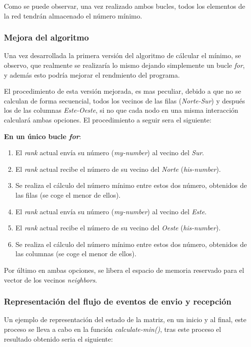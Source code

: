 \documentclass[11pt]{article}
\begin{document}



Como se puede observar, una vez realizado ambos bucles, todos los elementos de la red tendrán almacenado el número mínimo.


\subsubsection{Mejora del algoritmo}
Una vez desarrollada la primera versión del algoritmo de cálcular el mínimo, se observo, que realmente se realizaría lo mismo dejando simplemente un bucle \textit{for}, y además esto podría mejorar el rendmiento del programa.

El procedimiento de esta versión mejorada, es mas peculiar, debido a que no se calculan de forma secuencial, todos los vecinos de las filas (\textit{Norte-Sur}) y después los de las columnas \textit{Este-Oeste}, si no que cada nodo en una misma interacción calculará ambas opciones. El procedimiento a seguir sera el siguiente:

\textbf{En un único bucle \textit{for}}:
\begin{enumerate}
	\item El \textit{rank} actual envía su número (\textit{my-number}) al vecino del \textit{Sur}.
	\item El \textit{rank} actual recibe el número de su vecino del \textit{Norte} (\textit{his-number}).
	\item Se realiza el cálculo del número mínimo entre estos dos número, obtenidos de las filas (se coge el menor de ellos).
	\item El \textit{rank} actual envía su número (\textit{my-number}) al vecino del \textit{Este}.
	\item El \textit{rank} actual recibe el número de su vecino del \textit{Oeste} (\textit{his-number}).
	\item Se realiza el cálculo del número mínimo entre estos dos número, obtenidos de las columnas (se coge el menor de ellos).
\end{enumerate}



Por último en ambas opciones, se libera el espacio de memoria reservado para el vector de los vecinos \textit{neighbors}.
\\

\subsubsection{Representación del flujo de eventos de envio y recepción}
Un ejemplo de representación del estado de la matriz, en un inicio y al final, este proceso se lleva a cabo en la función \textit{calculate-min()}, tras este proceso el resultado obtenido seria el siguiente:
\end{document}
